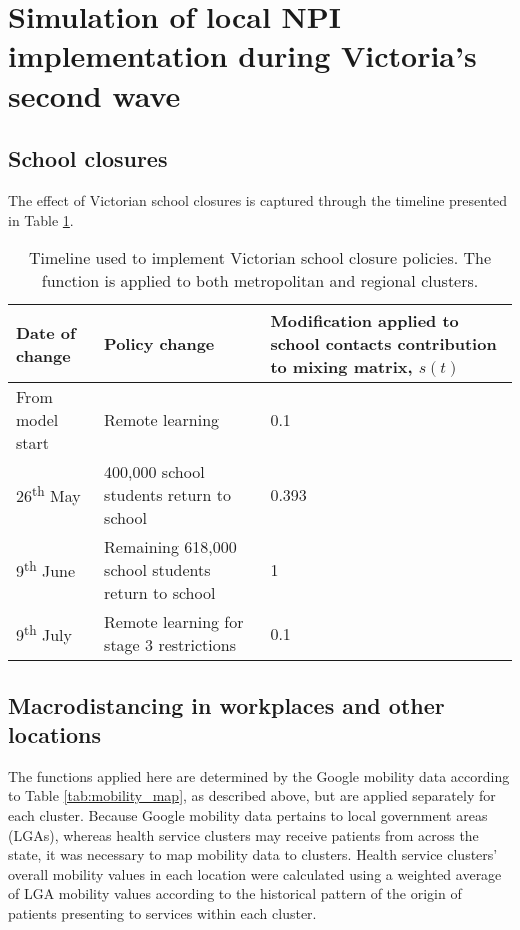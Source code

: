 \section{Simulation of local NPI implementation during Victoria's second wave}

\subsection{School closures}
The effect of Victorian school closures is captured through the timeline presented in Table \ref{tab:school_timeline}.


\begin{table}[ht]
\renewcommand{\baselinestretch}{1}
	\begin{tabular}[ht]{| p{4.2cm} | p{6.2cm} | p{3.2cm} |}
	\hline
		Date of change & Policy change & Modification applied to school contacts contribution to mixing matrix, \(s(t)\) \\
		\hline
		From model start & Remote learning & 0.1 \\
		\hline
		26\textsuperscript{th} May & 400,000 school students return to school & 0.393 \\
		\hline
		9\textsuperscript{th} June & Remaining 618,000 school students return to school & 1 \\
		\hline
		9\textsuperscript{th} July & Remote learning for stage 3 restrictions & 0.1 \\
		\hline
    \end{tabular}
    \caption{Timeline used to implement Victorian school closure policies. The function is applied to both metropolitan and regional clusters.}	
    \label{tab:school_timeline}
\end{table}

\subsection{Macrodistancing in workplaces and other locations}
The functions applied here are determined by the Google mobility data according to Table \ref{tab:mobility_map}, as described above, but are applied separately for each cluster. Because Google mobility data pertains to local government areas (LGAs), whereas health service clusters may receive patients from across the state, it was necessary to map mobility data to clusters. Health service clusters' overall mobility values in each location were calculated using a weighted average of LGA mobility values according to the historical pattern of the origin of patients presenting to services within each cluster.

